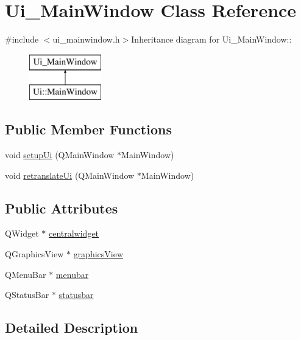 \hypertarget{class_ui___main_window}{
\section{Ui\_\-MainWindow Class Reference}
\label{class_ui___main_window}
}


{\ttfamily \#include $<$ui\_\-mainwindow.h$>$}Inheritance diagram for Ui\_\-MainWindow::\begin{figure}[H]
\begin{center}
\leavevmode
\includegraphics[height=2cm]{class_ui___main_window}
\end{center}
\end{figure}
\subsection*{Public Member Functions}
\begin{DoxyCompactItemize}
\item 
void \hyperlink{class_ui___main_window_acf4a0872c4c77d8f43a2ec66ed849b58}{setupUi} (QMainWindow $\ast$MainWindow)
\item 
void \hyperlink{class_ui___main_window_a097dd160c3534a204904cb374412c618}{retranslateUi} (QMainWindow $\ast$MainWindow)
\end{DoxyCompactItemize}
\subsection*{Public Attributes}
\begin{DoxyCompactItemize}
\item 
QWidget $\ast$ \hyperlink{class_ui___main_window_a356f1cf3ebda15f1fac59467ee081b74}{centralwidget}
\item 
QGraphicsView $\ast$ \hyperlink{class_ui___main_window_a713d8e541d9de8389ad4292131dc931a}{graphicsView}
\item 
QMenuBar $\ast$ \hyperlink{class_ui___main_window_adf43d9a67adaec750aaa956b5e082f09}{menubar}
\item 
QStatusBar $\ast$ \hyperlink{class_ui___main_window_a1687cceb1e2787aa1f83e50433943a91}{statusbar}
\end{DoxyCompactItemize}


\subsection{Detailed Description}


